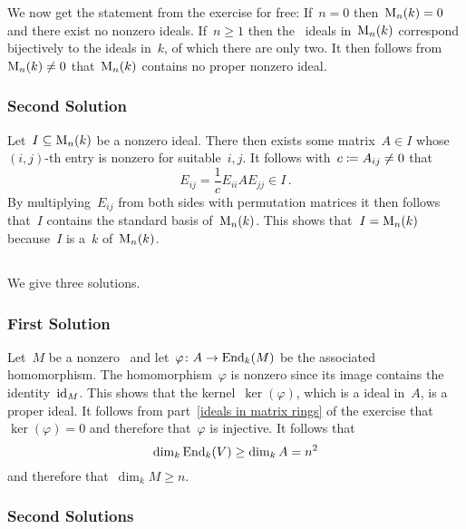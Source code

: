 We now get the statement from the exercise for free:
If~$n = 0$ then~$\operatorname{M}_{n}(k) = 0$ and there exist no nonzero {\twosided} ideals.
If~$n \geq 1$ then the~{\twosided} ideals in~$\operatorname{M}_{n}(k)$ correspond bijectively to the {\twosided} ideals in~$k$, of which there are only two.
It then follows from~$\operatorname{M}_{n}(k) \neq 0$ that~$\operatorname{M}_{n}(k)$ contains no proper nonzero ideal.



\subsubsection{Second Solution}

Let~$I \subseteq \operatorname{M}_{n}(k)$ be a nonzero ideal.
There then exists some matrix~$A \in I$ whose~$(i,j)$-th entry is nonzero for suitable~$i,j$.
It follows with~$c \coloneqq A_{ij} \neq 0$ that
\[
      E_{ij}
  =   \frac{1}{c} E_{ii} A E_{jj}
  \in I \,.
\]
By multiplying~$E_{ij}$ from both sides with permutation matrices it then follows that~$I$ contains the standard basis of~$\operatorname{M}_{n}(k)$.
This shows that~$I = \operatorname{M}_{n}(k)$ because~$I$ is a~$k${\dashsmod} of~$\operatorname{M}_{n}(k)$.





\subsection{}

We give three solutions.



\subsubsection{First Solution}

Let~$M$ be a nonzero~{\Amod} and let~$\varphi \colon A \to  \operatorname{End}_k(M)$ be the associated {\kalg} homomorphism.
The homomorphism~$\varphi$ is nonzero since its image contains the identity~$\operatorname{id}_M$.
This shows that the kernel~$\ker(\varphi)$, which is a {\twosided} ideal in~$A$, is a proper ideal.
It follows from part~\ref{ideals in matrix rings} of the exercise that~$\ker(\varphi) = 0$ and therefore that~$\varphi$ is injective.
It follows that
\[
        \dim_k  \operatorname{End}_k(V)
  \geq  \dim_k  A
  =             n^2
\]
and therefore that~$\dim_k M \geq n$.



\subsubsection{Second Solutions}

